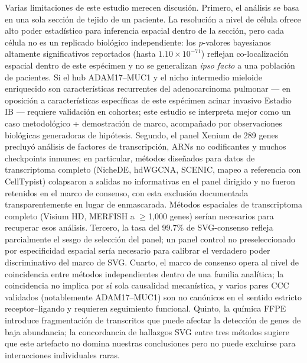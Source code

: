 \documentclass[12pt,a4paper]{article}
\begin{document}
Varias limitaciones de este estudio merecen discusión. Primero, el análisis se basa en una sola sección de tejido de un paciente. La resolución a nivel de célula ofrece alto poder estadístico para inferencia espacial dentro de la sección, pero cada célula no es un replicado biológico independiente: los $p$-valores bayesianos altamente significativos reportados (hasta $1.10 \times 10^{-71}$) reflejan co-localización espacial dentro de este espécimen y no se generalizan \emph{ipso facto} a una población de pacientes. Si el hub ADAM17--MUC1 y el nicho intermedio mieloide enriquecido son características recurrentes del adenocarcinoma pulmonar --- en oposición a características específicas de este espécimen acinar invasivo Estadio IB --- requiere validación en cohortes; este estudio se interpreta mejor como un caso metodológico + demostración de marco, acompañado por observaciones biológicas generadoras de hipótesis. Segundo, el panel Xenium de 289 genes precluyó análisis de factores de transcripción, ARNs no codificantes y muchos checkpoints inmunes; en particular, métodos diseñados para datos de transcriptoma completo (NicheDE, hdWGCNA, SCENIC, mapeo a referencia con CellTypist) colapsaron a salidas no informativas en el panel dirigido y no fueron retenidos en el marco de consenso, con esta exclusión documentada transparentemente en lugar de enmascarada. Métodos espaciales de transcriptoma completo (Visium HD, MERFISH a $\geq$1,000 genes) serían necesarios para recuperar esos análisis. Tercero, la tasa del 99.7\% de SVG-consenso refleja parcialmente el sesgo de selección del panel; un panel control no preseleccionado por especificidad espacial sería necesario para calibrar el verdadero poder discriminativo del marco de SVG. Cuarto, el marco de consenso opera al nivel de coincidencia entre métodos independientes dentro de una familia analítica; la coincidencia no implica por sí sola causalidad mecanística, y varios pares CCC validados (notablemente ADAM17--MUC1) son no canónicos en el sentido estricto receptor--ligando y requieren seguimiento funcional. Quinto, la química FFPE introduce fragmentación de transcritos que puede afectar la detección de genes de baja abundancia; la concordancia de hallazgos SVG entre tres métodos sugiere que este artefacto no domina nuestras conclusiones pero no puede excluirse para interacciones individuales raras.
\end{document}
